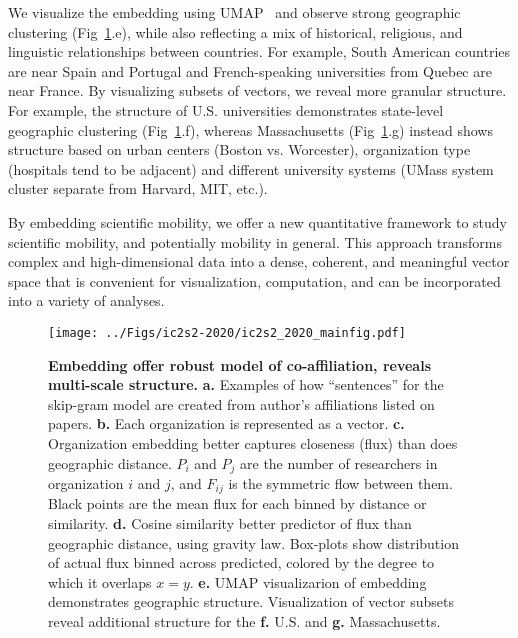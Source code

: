 \documentclass[a4paper,12pt]{article}
\begin{document}
We visualize the embedding using UMAP~\autocite{mcinnes_umap_2018} and observe strong geographic clustering (Fig~\ref{fig:image}.e), while also reflecting a mix of historical, religious, and linguistic relationships between countries. 
For example, South American countries are near Spain and Portugal and French-speaking universities from Quebec are near France. 
By visualizing subsets of vectors, we reveal more granular structure.
For example, the structure of U.S. universities demonstrates state-level geographic clustering (Fig~\ref{fig:image}.f), whereas Massachusetts (Fig~\ref{fig:image}.g) instead shows structure based on urban centers (Boston vs. Worcester), organization type (hospitals tend to be adjacent) and different university systems (UMass system cluster separate from Harvard, MIT, etc.).

By embedding scientific mobility, we offer a new quantitative framework to study scientific mobility, and potentially mobility in general. 
This approach transforms complex and high-dimensional data into a dense, coherent, and meaningful vector space that is convenient for visualization, computation, and can be incorporated into a variety of analyses. 
\newpage

\begin{figure}[ht!]
	\centering
	\texttt{[image: ../Figs/ic2s2-2020/ic2s2\_2020\_mainfig.pdf]}
	\caption{ 
	\textbf{Embedding offer robust model of co-affiliation, reveals multi-scale structure.}
	\textbf{a.} Examples of how ``sentences'' for the skip-gram model are created from author's affiliations listed on papers.
	\textbf{b.} Each organization is represented as a vector.
	\textbf{c.} Organization embedding better captures closeness (flux) than does geographic distance. 
 $P_{i}$ and $P_{j}$ are the number of researchers in organization $i$ and $j$, and $F_{ij}$ is the symmetric flow between them.
	Black points are the mean flux for each binned by distance or similarity. 
	\textbf{d.} Cosine similarity better predictor of flux than geographic distance, using gravity law. 
	Box-plots show distribution of actual flux binned across predicted, colored by the degree to which it overlaps $x = y$. 
	\textbf{e.} UMAP visualizarion of embedding demonstrates geographic structure.
	Visualization of vector subsets reveal additional structure for the \textbf{f.} U.S. and \textbf{g.} Massachusetts. 
	 }
	\label{fig:image}
\end{figure}



%
%
%
\begingroup
{}
\small
\setlength\bibitemsep{1pt}
{\renewcommand{\markboth}[2]{}%
\printbibliography}
\endgroup
\end{document}
